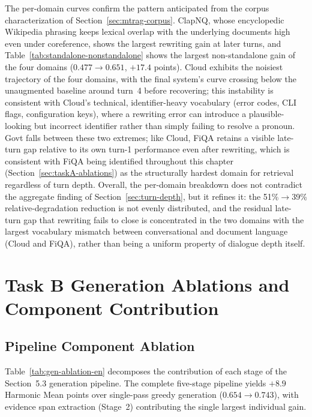 The per-domain curves confirm the pattern anticipated from the corpus characterization of
Section~\ref{sec:mtrag-corpus}. ClapNQ, whose encyclopedic Wikipedia phrasing keeps lexical overlap
with the underlying documents high even under coreference, shows the largest rewriting gain at later
turns, and Table~\ref{tab:standalone-nonstandalone} shows the largest non-standalone gain of the four
domains ($0.477 \rightarrow 0.651$, $+17.4$ points). Cloud exhibits the noisiest
trajectory of the four domains, with the final system's curve crossing below the unaugmented
baseline around turn~4 before recovering; this instability is consistent with Cloud's technical,
identifier-heavy vocabulary (error codes, CLI flags, configuration keys), where a rewriting error
can introduce a plausible-looking but incorrect identifier rather than simply failing to resolve a
pronoun. Govt falls between these two extremes; like Cloud, FiQA retains a visible late-turn gap
relative to its own turn-1 performance even after rewriting, which is consistent with FiQA being
identified throughout this chapter (Section~\ref{sec:taskA-ablations}) as the structurally hardest
domain for retrieval regardless of turn depth. Overall, the per-domain breakdown does not
contradict the aggregate finding of Section~\ref{sec:turn-depth}, but it refines it: the 51\%$\to$39\%
relative-degradation reduction is not evenly distributed, and the residual late-turn gap that
rewriting fails to close is concentrated in the two domains with the largest vocabulary mismatch
between conversational and document language (Cloud and FiQA), rather than being a uniform property
of dialogue depth itself.

\section{Task B Generation Ablations and Component Contribution}
\label{sec:taskB-ablations}

\subsection{Pipeline Component Ablation}

Table~\ref{tab:gen-ablation-en} decomposes the contribution of each stage of the Section~5.3 generation pipeline. The complete five-stage pipeline yields $+8.9$ Harmonic Mean points over single-pass greedy generation ($0.654 \rightarrow 0.743$), with evidence span extraction (Stage~2) contributing the single largest individual gain.

